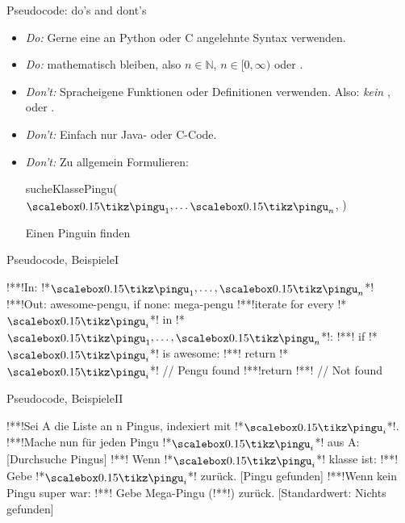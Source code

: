 \begin{frame}[t]{Pseudocode: do's and dont's}
    \begin{itemize}[<+(1)->]
        \itemsep7.5pt
        \item \emph{Do:} Gerne eine an Python oder C angelehnte Syntax verwenden.
        \item \emph{Do:} mathematisch bleiben, also $n \in \mathbb{N}$, $n \in [0,\infty)$ oder .
        \item \emph{Don't:} Spracheigene  Funktionen oder Definitionen verwenden.\pause{} Also: \emph{kein} ,  oder .
        \item \emph{Don't:} Einfach nur Java- oder C-Code.
        \item \emph{Don't:} Zu allgemein Formulieren:\smallskip
\setcounter{algocf}{3}
\begin{algorithm}[H]
\PreCode
\StartCode
    \pause sucheKlassePingu($\tpingu_1, \ldots \tpingu_n$, \raisebox{-1pt}{\scalebox{0.15}{\tikz{\tagent}}})\;
    \caption{Einen  Pinguin finden}
\end{algorithm}
    \end{itemize}
\end{frame}

\begin{frame}[fragile,c]{Pseudocode, Beispiele\hfill I}
\begin{plainvoid}[morecomment={[l]//}]
!**!In: !*$\tpingu_1, \ldots, \tpingu_n$*!
!**!Out: awesome-pengu, if none: mega-pengu
!**!iterate for every !*$\tpingu_i$*! in !*$\tpingu_1, \ldots, \tpingu_n$*!:
!**!    if !*$\tpingu_i$*! is awesome: !**! return !*$\tpingu_i$*! // Pengu found
!**!return !*\raisebox{-1pt}{\scalebox{0.15}{\tikz{\tagent}}}*! // Not found
\end{plainvoid}
\end{frame}

\begin{frame}[fragile,c]{Pseudocode, Beispiele\hfill II}
\begin{plainvoid}[morecomment={[s]\[\]}]
!**!Sei A die Liste an n Pingus, indexiert mit !*$\tpingu_i$*!.
!**!Mache nun für jeden Pingu !*$\tpingu_i$*! aus A: [Durchsuche Pingus]
!**!    Wenn !*$\tpingu_i$*! klasse ist:
!**!            Gebe !*$\tpingu_i$*! zurück. [Pingu gefunden]
!**!Wenn kein Pingu super war:
!**!    Gebe Mega-Pingu (!*\raisebox{-1pt}{\scalebox{0.15}{\tikz{\tagent}}}*!) zurück. [Standardwert: Nichts gefunden]
\end{plainvoid}
\end{frame}
\fi

